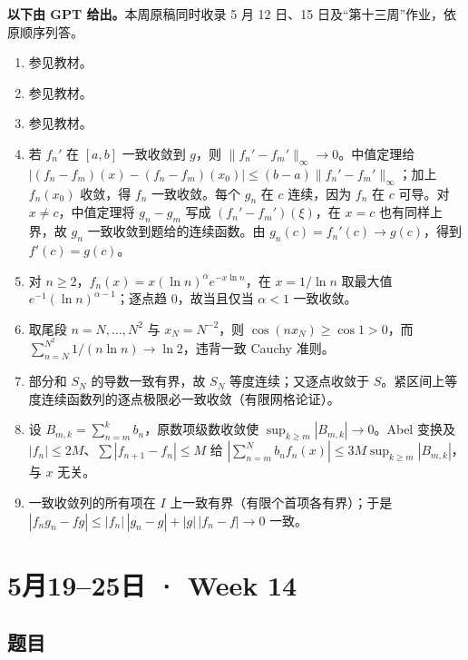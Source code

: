 \documentclass[UTF8,11pt, a4paper, oneside, fontset=none]{ctexbook}
\begin{document}
\noindent\textbf{以下由 GPT 给出。}本周原稿同时收录 5 月 12 日、15 日及“第十三周”作业，依原顺序列答。
\begin{enumerate}
\item 参见教材。
\item 参见教材。
\item 参见教材。
\item 若 $f_n'$ 在 $[a,b]$ 一致收敛到 $g$，则 $\lVert{}f_n'-f_m'\rVert_\infty\to0$。中值定理给 $|(f_n-f_m)(x)-(f_n-f_m)(x_0)|\le(b-a)\lVert{}f_n'-f_m'\rVert_\infty$；加上 $f_n(x_0)$ 收敛，得 $f_n$ 一致收敛。每个 $g_n$ 在 $c$ 连续，因为 $f_n$ 在 $c$ 可导。对 $x\ne c$，中值定理将 $g_n-g_m$ 写成 $(f_n'-f_m')(\xi)$，在 $x=c$ 也有同样上界，故 $g_n$ 一致收敛到题给的连续函数。由 $g_n(c)=f_n'(c)\to g(c)$，得到 $f'(c)=g(c)$。
\item 对 $n\ge2$，$f_n(x)=x(\ln n)^\alpha e^{-x\ln n}$，在 $x=1/\ln n$ 取最大值 $e^{-1}(\ln n)^{\alpha-1}$；逐点趋 $0$，故当且仅当 $\alpha<1$ 一致收敛。
\item 取尾段 $n=N,\ldots,N^2$ 与 $x_N=N^{-2}$，则 $\cos(nx_N)\ge\cos1>0$，而 $\sum_{n=N}^{N^2}1/(n\ln n)\to\ln2$，违背一致 Cauchy 准则。
\item 部分和 $S_N$ 的导数一致有界，故 $S_N$ 等度连续；又逐点收敛于 $S$。紧区间上等度连续函数列的逐点极限必一致收敛（有限网格论证）。
\item 设 $B_{m,k}=\sum_{n=m}^kb_n$，原数项级数收敛使 $\sup_{k\ge m}|B_{m,k}|\to0$。Abel 变换及 $|f_n|\le2M$、$\sum|f_{n+1}-f_n|\le M$ 给 $|\sum_{n=m}^Nb_nf_n(x)|\le3M\sup_{k\ge m}|B_{m,k}|$，与 $x$ 无关。
\item 一致收敛列的所有项在 $I$ 上一致有界（有限个首项各有界）；于是 $|f_ng_n-fg|\le|f_n|\,|g_n-g|+|g|\,|f_n-f|\to0$ 一致。
\end{enumerate}

\clearpage

\section{5月19--25日 · Week 14}

\subsection*{题目}
\end{document}
